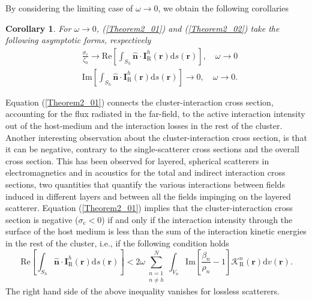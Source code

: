 \documentclass{article}
\newtheorem{corollary}{Corollary}
\begin{document}
By considering the limiting case of $\omega\rightarrow0$, we obtain the following corollaries
%
\begin{corollary}\label{corol2}
    For $\omega\rightarrow0$, (\ref{Theorem2_01}) and (\ref{Theorem2_02}) take the following asymptotic forms, respectively
%
\begin{align}
   \label{Corollary2_01}
       &\frac{\sigma_\mathrm{c}}{\zeta_0}\rightarrow\mathrm{Re}\left[\int_{S_h}\hat{\mathbf{n}}\cdot\mathbf{I}_{\mathrm{R}}^{h}(\mathbf{r})\mathrm{d}s(\mathbf{r})\right], \quad \omega\rightarrow0\\
       \label{Corollary2_02}
        &\mathrm{Im}\left[\int_{S_h}\hat{\mathbf{n}}\cdot\mathbf{I}_{\mathrm{R}}^{h}(\mathbf{r})\mathrm{d}s(\mathbf{r})\right]\rightarrow0, \quad \omega\rightarrow0.
        \end{align}
\end{corollary}
%

Equation (\ref{Theorem2_01}) connects the cluster-interaction cross section, accounting for the flux radiated in the far-field, to the active interaction intensity out of the host-medium and the interaction losses in the rest of the cluster. Another interesting observation about the cluster-interaction cross section, is that it can be negative, contrary to the single-scatterer cross sections and the overall cross section. This has been observed for layered, spherical scatterers in electromagnetics \cite{SAPM,OJAP} and in acoustics \cite{QAM1} for the total and indirect interaction cross sections, two quantities that quantify the various interactions between fields induced in different layers and between all the fields impinging on the layered scatterer. Equation (\ref{Theorem2_01}) implies that the cluster-interaction cross section is negative ($\sigma_\mathrm{c}<0$) if and only if the interaction intensity through the surface of the host medium is less than the sum of the interaction kinetic energies in the rest of the cluster, i.e., if the following condition holds
%
\begin{equation}
    \label{Theorem2_05}
    \mathrm{Re}\left[\int_{S_h}\hat{\mathbf{n}}\cdot\mathbf{I}_{\mathrm{R}}^{h}(\mathbf{r})\mathrm{d}s(\mathbf{r})\right]<2\omega\sum_{\substack{n=1\\n\ne h}}^{N}\int_{V_n}\mathrm{Im}\left[\frac{\beta_n}{\rho_n}-1\right]\mathcal{K}_{\mathrm{R}}^n(\mathbf{r})\mathrm{d}v(\mathbf{r}).
\end{equation}
%
The right hand side of the above inequality vanishes for lossless scatterers.
\end{document}
